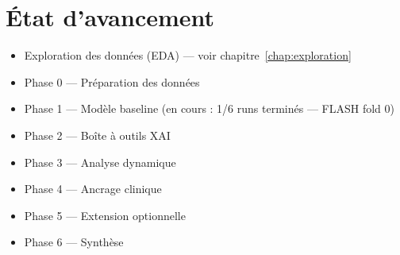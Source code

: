 \section{État d'avancement}

\begin{itemize}[nosep]
    \item[\checkmark] Exploration des données (EDA) --- voir chapitre~\ref{chap:exploration}
    \item[\checkmark] Phase 0 --- Préparation des données
    \item[$\blacksquare$] Phase 1 --- Modèle baseline (en cours : 1/6 runs terminés --- FLASH fold 0)
    \item[$\square$] Phase 2 --- Boîte à outils XAI
    \item[$\square$] Phase 3 --- Analyse dynamique
    \item[$\square$] Phase 4 --- Ancrage clinique
    \item[$\square$] Phase 5 --- Extension optionnelle
    \item[$\square$] Phase 6 --- Synthèse
\end{itemize}
